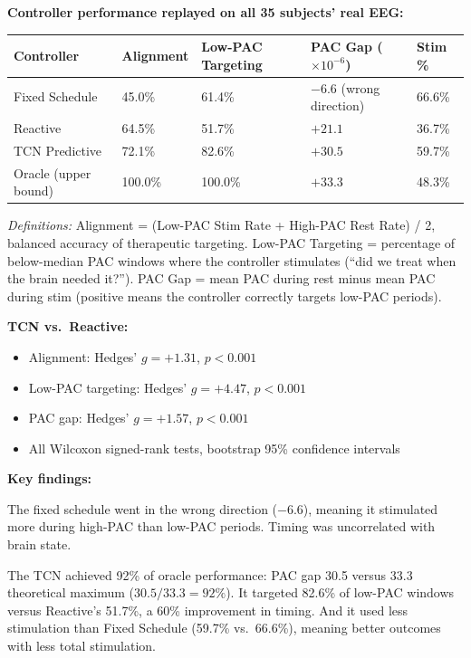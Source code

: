 \documentclass[11pt,letterpaper]{article}
\begin{document}
\textbf{Controller performance replayed on all 35 subjects' real EEG:}

\vspace{0.5em}
\begin{tabular}{@{}lllll@{}}
\toprule
\textbf{Controller} & \textbf{Alignment} & \textbf{Low-PAC Targeting} & \textbf{PAC Gap ($\times 10^{-6}$)} & \textbf{Stim \%} \\
\midrule
Fixed Schedule   & 45.0\%  & 61.4\% & $-6.6$ (wrong direction) & 66.6\% \\
Reactive         & 64.5\%  & 51.7\% & $+21.1$                  & 36.7\% \\
TCN Predictive   & 72.1\%  & 82.6\% & $+30.5$                  & 59.7\% \\
Oracle (upper bound) & 100.0\% & 100.0\% & $+33.3$             & 48.3\% \\
\bottomrule
\end{tabular}
\vspace{0.5em}

\textit{Definitions:} Alignment = (Low-PAC Stim Rate + High-PAC Rest Rate) / 2, balanced
accuracy of therapeutic targeting. Low-PAC Targeting = percentage of below-median PAC windows
where the controller stimulates (``did we treat when the brain needed it?''). PAC Gap = mean
PAC during rest minus mean PAC during stim (positive means the controller correctly targets
low-PAC periods).

\textbf{TCN vs.\ Reactive:}
\begin{itemize}[noitemsep]
  \item Alignment: Hedges' $g = +1.31$, $p < 0.001$
  \item Low-PAC targeting: Hedges' $g = +4.47$, $p < 0.001$
  \item PAC gap: Hedges' $g = +1.57$, $p < 0.001$
  \item All Wilcoxon signed-rank tests, bootstrap 95\% confidence intervals
\end{itemize}

\textbf{Key findings:}

The fixed schedule went in the wrong direction ($-6.6$), meaning it stimulated more during
high-PAC than low-PAC periods. Timing was uncorrelated with brain state.

The TCN achieved 92\% of oracle performance: PAC gap 30.5 versus 33.3 theoretical maximum
($30.5/33.3 = 92\%$). It targeted 82.6\% of low-PAC windows versus Reactive's 51.7\%, a 60\%
improvement in timing. And it used less stimulation than Fixed Schedule (59.7\% vs.\ 66.6\%),
meaning better outcomes with less total stimulation.
\end{document}

